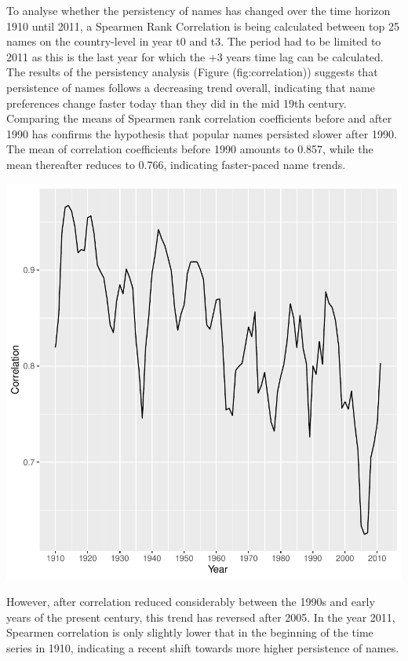 \documentclass[11pt,preprint]{elsarticle}
\let\origfigure\figure
\let\endorigfigure\endfigure
\renewenvironment{figure}[1][2] {
    \expandafter\origfigure\expandafter[H]
} {
    \endorigfigure
}
\numberwithin{equation}{section}
\numberwithin{figure}{section}
\numberwithin{table}{section}
\begin{document}
To analyse whether the persistency of names has changed over the time
horizon 1910 until 2011, a Spearmen Rank Correlation is being calculated
between top 25 names on the country-level in year t0 and t3. The period
had to be limited to 2011 as this is the last year for which the +3
years time lag can be calculated. The results of the persistency
analysis (Figure \textcite{ref}(fig:correlation)) suggests that
persistence of names follows a decreasing trend overall, indicating that
name preferences change faster today than they did in the mid 19th
century. Comparing the means of Spearmen rank correlation coefficients
before and after 1990 has confirms the hypothesis that popular names
persisted slower after 1990. The mean of correlation coefficients before
1990 amounts to 0.857, while the mean thereafter reduces to 0.766,
indicating faster-paced name trends.

\begin{figure}[H]

{\centering \includegraphics{Task_1_ReadMe_files/figure-latex/fig-correlation-1} 

}

\caption{Correlation Trend Over Time (1910–2011)}\label{fig:fig-correlation}
\end{figure}

However, after correlation reduced considerably between the 1990s and
early years of the present century, this trend has reversed after 2005.
In the year 2011, Spearmen correlation is only slightly lower that in
the beginning of the time series in 1910, indicating a recent shift
towards more higher persistence of names.
\end{document}
